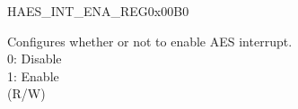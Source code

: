 \begin{register}{H}{AES\_INT\_ENA\_REG}{0x00B0}\label{regdesc:AESINTENAREG}
%
%
\regnewline%
\begin{regdesc}\begin{reglist}
\item [AES\_INT\_ENA] Configures whether or not to enable AES interrupt.\\
0: Disable\\
1: Enable \\
(R/W)
\end{reglist}\end{regdesc}
\end{register}
